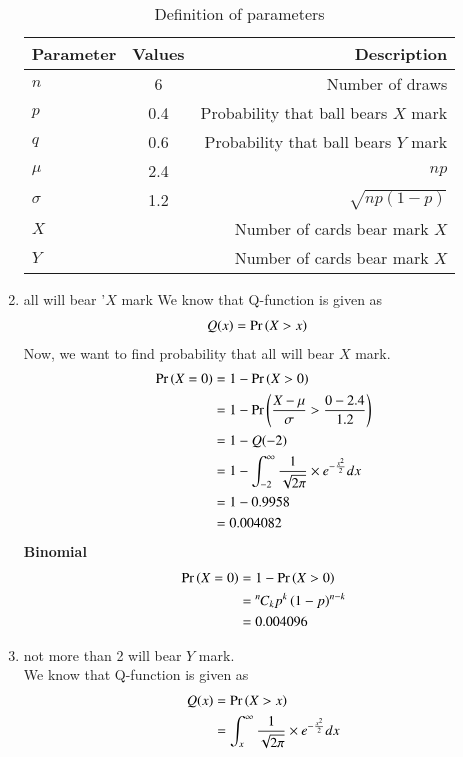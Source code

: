 \documentclass[journal,12pt,twocolumn]{IEEEtran}
\theoremstyle{remark}
\begin{document}
\begin{enumerate}
\begin{table}[!ht]
\centering
\begin{tabular}{|l|c|r|}
    \hline
    Parameter & Values & Description\\
    \hline
    $n$ & 6 & Number of draws\\
    \hline
    $p$ & 0.4 & Probability that ball bears $X$ mark \\
    \hline
    $q$ & 0.6 & Probability that ball bears $Y$ mark \\
    \hline
    $\mu$ & 2.4 & $np$ \\
    \hline
    $\sigma $ & 1.2 & $\sqrt{np(1 - p)} $\\
    \hline
    $X$ &  & Number of cards bear mark $X$ \\
    \hline
    $Y$ &  & Number of cards bear mark $X$ \\
    \hline
\end{tabular}
\caption{Definition of parameters}
\label{tab:gaussian/9/3/17}
\end{table}
\item all will bear '$X$ mark
We know that Q-function is given as
\begin{align}
Q(x) &= \Pr\left(X > x\right)
\end{align}
Now, we want to find probability that all will bear $X$ mark.
\begin{align}
\Pr\left(X = 0\right) &=1-\Pr\left(X > 0\right) \\
&=1-\Pr\left(\frac{X - \mu}{\sigma} > \frac{0 - 2.4}{1.2}\right) \\
&= 1- Q(-2)\\
&= 1- \int_{-2}^{\infty}\frac{1}{\sqrt{2\pi}}\times e^{-\frac{x^2}{2}}dx\\
&= 1-0.9958\\
&=0.004082
\end{align}
\textbf{Binomial}
\begin{align}
\Pr\left(X =0\right) &= 1 - \Pr\left(X> 0\right) \\
&= {{}^{n}\mkern-1muC_{k}}p^k\left(1-p\right)^{n-k} \\
&= 0.004096
\end{align}
\item not more than 2 will bear $Y$ mark.\\
We know that Q-function is given as\\
\begin{align}
Q(x) &= \Pr\left(X > x\right)\\
&= \int_{x}^{\infty}\frac{1}{\sqrt{2\pi}}\times e^{-\frac{x^2}{2}}dx
\end{align}

\end{enumerate}
\end{document}
